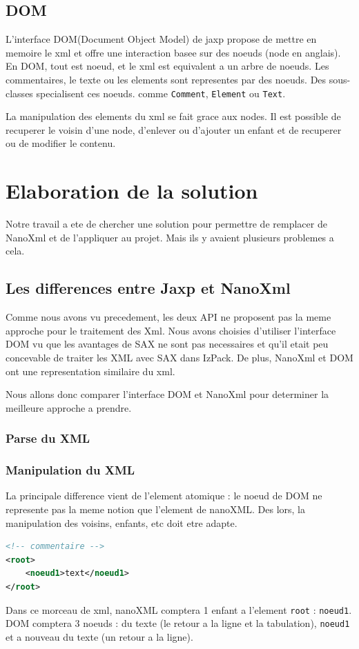 \subsection{DOM}
L'interface DOM(Document Object Model) de jaxp propose de mettre en memoire le xml et offre une interaction basee sur des noeuds (node en anglais). En DOM, tout est noeud, et le xml est equivalent a un arbre de noeuds. Les commentaires, le texte ou les elements sont representes par des noeuds. Des sous-classes specialisent ces noeuds. comme \verb|Comment|, \verb|Element| ou \verb|Text|.

La manipulation des elements du xml se fait grace aux nodes. Il est possible de recuperer le voisin d'une node, d'enlever ou d'ajouter un enfant et de recuperer ou de modifier le contenu.
\section{Elaboration de la solution}
Notre travail a ete de chercher une solution pour permettre de remplacer de NanoXml et de l'appliquer au projet. Mais ils y avaient plusieurs problemes a cela.
\subsection{Les differences entre Jaxp et NanoXml}
Comme nous avons vu precedement, les deux API ne proposent pas la meme approche pour le traitement des Xml. Nous avons choisies d'utiliser l'interface DOM vu que les avantages de SAX ne sont pas necessaires et qu'il etait peu concevable de traiter les XML avec SAX dans IzPack. De plus, NanoXml et DOM ont une representation similaire du xml.

Nous allons donc comparer l'interface DOM et NanoXml pour determiner la meilleure approche a prendre.
\subsubsection{Parse du XML}

\subsubsection{Manipulation du XML}
La principale difference vient de l'element atomique : le noeud de DOM ne represente pas la meme notion que l'element de nanoXML. Des lors, la manipulation des voisins, enfants, etc doit etre adapte.
\begin{lstlisting}[language=xml]
<!-- commentaire -->
<root>
	<noeud1>text</noeud1>
</root>
\end{lstlisting}
Dans ce morceau de xml, nanoXML comptera 1 enfant a l'element \verb|root| : \verb|noeud1|. DOM comptera 3 noeuds : du texte (le retour a la ligne et la tabulation), \verb|noeud1| et a nouveau du texte (un retour a la ligne).

